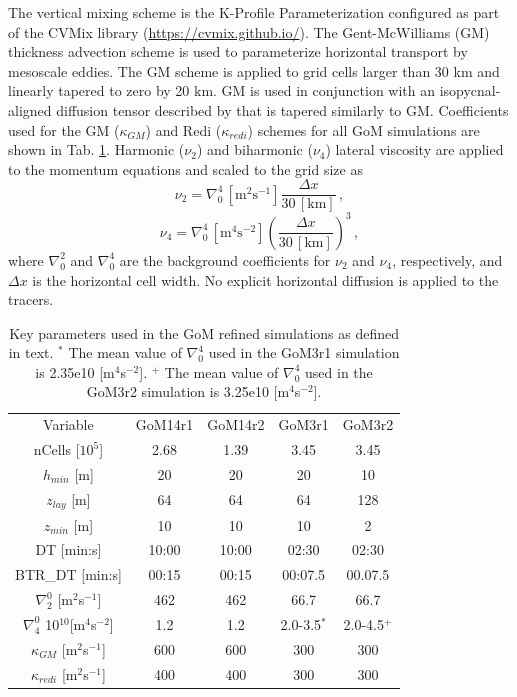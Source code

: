 The vertical mixing scheme is the K-Profile Parameterization \citep[KPP, ][]{large1994oceanic, van2018kpp} configured as part of the CVMix library (\url{https://cvmix.github.io/}). The Gent-McWilliams (GM) thickness advection scheme \citep{gent1990isopycnal} is used to parameterize horizontal transport by mesoscale eddies. The GM scheme is applied to grid cells larger than 30 km and linearly tapered to zero by 20 km. GM is used in conjunction with an isopycnal-aligned diffusion tensor described by \cite{redi1982oceanic} that is tapered similarly to GM. Coefficients used for the GM ($\kappa_{GM}$) and Redi ($\kappa_{redi}$) schemes for all GoM simulations are shown in Tab. \ref{tab:mpaso_sims}. Harmonic ($\nu_2$) and biharmonic ($\nu_4$) lateral viscosity are applied to the momentum equations and scaled to the grid size as 
\begin{equation}
    \nu_2 = \nabla_0^4 \, [\textrm{m}^2 \textrm{s}^{-1}] \frac{\Delta x}{30 \, [\textrm{km}]} \, ,
\end{equation}
\begin{equation}
    \nu_4 = \nabla_0^4 \, [\textrm{m}^4 \textrm{s}^{-2}] \left(\frac{\Delta x}{30 \, [\textrm{km}]}\right)^3 \, ,  
\end{equation}
where $\nabla_0^2$ and $\nabla_0^4$ are the background coefficients for $\nu_2$ and $\nu_4$, respectively, and $\Delta x$ is the horizontal cell width. No explicit horizontal diffusion is applied to the tracers. 

\begin{table}[t] 
\caption{Key parameters used in the GoM refined simulations as defined in text. $^*$ The mean value of $\nabla_0^4$ used in the GoM3r1 simulation is 2.35e10 [m$^4$s$^{-2}$]. $^+$ The mean value of $\nabla_0^4$ used in the GoM3r2 simulation is 3.25e10 [m$^4$s$^{-2}$].} \label{tab:mpaso_sims}
\begin{center}
\begin{tabular}{ccccc}
\hline
Variable & GoM14r1 & GoM14r2 & GoM3r1 & GoM3r2 \\
nCells [$10^5$] & 2.68 & 1.39 & 3.45 & 3.45 \\
$h_{min}$ [m] & 20 & 20 & 20 & 10 \\
$z_{lay}$ [m] & 64 & 64 & 64 & 128 \\
$z_{min}$ [m] & 10 & 10 & 10 & 2 \\
DT [min:s] & 10:00 & 10:00 & 02:30 & 02:30 \\
BTR\_DT [min:s] & 00:15 & 00:15 & 00:07.5 & 00.07.5 \\
$\nabla_2^0$ [m$^2$s$^{-1}$] & 462 & 462 & 66.7 & 66.7 \\
$\nabla_4^0$ 10$^{10}$[m$^4$s$^{-2}$] & 1.2 & 1.2 & 2.0-3.5$^*$ & 2.0-4.5$^+$ \\
$\kappa_{GM}$ [m$^2$s$^{-1}$] & 600 & 600 & 300 & 300 \\
$\kappa_{redi}$ [m$^2$s$^{-1}$] & 400 & 400 & 300 & 300 \\
\hline
\end{tabular}
\end{center}
\end{table}

